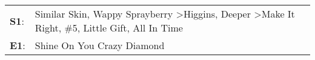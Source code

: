 \begin{supertabular}{p{0.03\textwidth}p{0.92\textwidth}}
 \textbf{S1}:  &  Similar Skin\textsuperscript{}, \enspace Wappy Sprayberry\textsuperscript{} \textgreater \enspace Higgins\textsuperscript{}, \enspace Deeper\textsuperscript{} \textgreater \enspace Make It Right\textsuperscript{}, \enspace \#5\textsuperscript{}, \enspace Little Gift\textsuperscript{}, \enspace All In Time\textsuperscript{}  \enspace  \\
 \textbf{E1}:  &                                                                                                                                                                                                                                                                                          Shine On You Crazy Diamond\textsuperscript{}  \enspace  \\
\end{supertabular}
